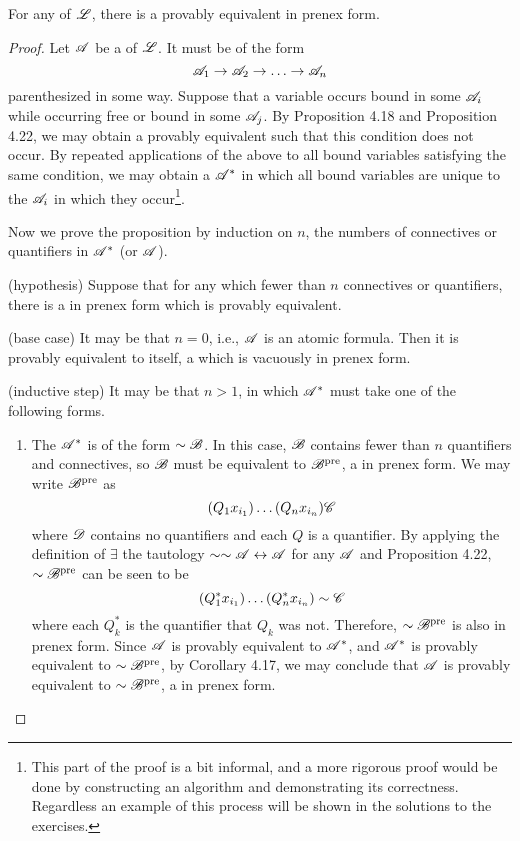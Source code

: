 \begin{proposition}
  For any \wf{} of \(\mathscr{L}\), there is a provably equivalent \wf{} in prenex form.

  \begin{proof}
    Let \(\mathscr{A}\) be a \wf{} of \(\mathscr{L}\). It must be of the form
    \[\cua_1 \ra \cua_2 \ra \dots \ra \cua_n\]
    parenthesized in some way. Suppose that a variable occurs bound in some \(\mathscr{A}_i\) while occurring free or bound in some \(\mathscr{A}_j\). By Proposition 4.18 and Proposition 4.22, we may obtain a provably equivalent \wf{} such that this condition does not occur. By repeated applications of the above to all bound variables satisfying the same condition, we may obtain a \wf{} \(\mathscr{A}^*\) in which all bound variables are unique to the \(\mathscr{A}_i\) in which they occur\footnote{This part of the proof is a bit informal, and a more rigorous proof would be done by constructing an algorithm and demonstrating its correctness. Regardless an example of this process will be shown in the solutions to the exercises.}.

    Now we prove the proposition by induction on \(n\), the numbers of connectives or quantifiers in \(\mathscr{A}^*\) (or \(\mathscr{A}\)).

    (hypothesis) Suppose that for any \wf{} which fewer than \(n\) connectives or quantifiers, there is a \wf{} in prenex form which is provably equivalent.

    (base case) It may be that \(n = 0\), i.e., \(\mathscr{A}\) is an atomic formula. Then it is provably equivalent to itself, a \wf{} which is vacuously in prenex form.

    (inductive step) It may be that \(n > 1\), in which \(\mathscr{A}^*\) must take one of the following forms.

    \begin{enumerate}
      \item The \wf{} \(\mathscr{A}^*\) is of the form \(\sim\mathscr{B}\). In this case, \(\mathscr{B}\) contains fewer than \(n\) quantifiers and connectives, so \(\mathscr{B}\) must be equivalent to \(\mathscr{B}^\text{pre}\), a \wf{} in prenex form. We may write \(\mathscr{B}^\text{pre}\) as
        \[(Q_1 x_{i_1})\dots(Q_n x_{i_n})\mathscr{C}\]
        where \(\mathscr{D}\) contains no quantifiers and each \(Q\) is a quantifier. By applying the definition of \(\exists\) the tautology \(\sim\sim\mathscr{A} \leftrightarrow \mathscr{A}\) for any \wf{} \(\mathscr{A}\) and Proposition 4.22, \(\sim\mathscr{B}^\text{pre}\) can be seen to be
        \[(Q^*_1 x_{i_1})\dots(Q^*_n x_{i_n})\sim\mathscr{C}\]
        where each \(Q^*_k\) is the quantifier that \(Q_k\) was not. Therefore, \(\sim\mathscr{B}^\text{pre}\) is also in prenex form. Since \(\mathscr{A}\) is provably equivalent to \(\mathscr{A}^*\), and \(\mathscr{A}^*\) is provably equivalent to \(\sim\mathscr{B}^\text{pre}\), by Corollary 4.17, we may conclude that \(\mathscr{A}\) is provably equivalent to \(\sim\mathscr{B}^\text{pre}\), a \wf{} in prenex form.


\end{enumerate}
\end{proof}
\end{proposition}
